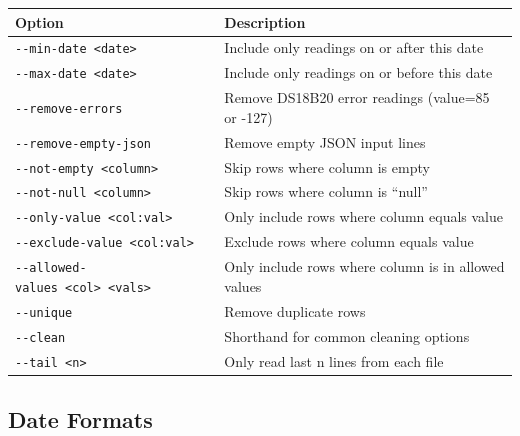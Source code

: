 \documentclass[
]{book}
\begin{document}
{\def\LTcaptype{} %
\begin{longtable}[]{@{}
  >{\raggedright\arraybackslash}p{}
  >{\raggedright\arraybackslash}p{}@{}}
\toprule\noalign{}
\begin{minipage}[b]{\linewidth}\raggedright
Option
\end{minipage} & \begin{minipage}[b]{\linewidth}\raggedright
Description
\end{minipage} \\
\midrule\noalign{}
\endhead
\bottomrule\noalign{}
\endlastfoot
\texttt{-\/-min-date\ \textless{}date\textgreater{}} & Include only readings on or after this date \\
\texttt{-\/-max-date\ \textless{}date\textgreater{}} & Include only readings on or before this date \\
\texttt{-\/-remove-errors} & Remove DS18B20 error readings (value=85 or -127) \\
\texttt{-\/-remove-empty-json} & Remove empty JSON input lines \\
\texttt{-\/-not-empty\ \textless{}column\textgreater{}} & Skip rows where column is empty \\
\texttt{-\/-not-null\ \textless{}column\textgreater{}} & Skip rows where column is ``null'' \\
\texttt{-\/-only-value\ \textless{}col:val\textgreater{}} & Only include rows where column equals value \\
\texttt{-\/-exclude-value\ \textless{}col:val\textgreater{}} & Exclude rows where column equals value \\
\texttt{-\/-allowed-values\ \textless{}col\textgreater{}\ \textless{}vals\textgreater{}} & Only include rows where column is in allowed values \\
\texttt{-\/-unique} & Remove duplicate rows \\
\texttt{-\/-clean} & Shorthand for common cleaning options \\
\texttt{-\/-tail\ \textless{}n\textgreater{}} & Only read last n lines from each file \\
\end{longtable}
}

\subsection{Date Formats}\label{date-formats}
\end{document}
